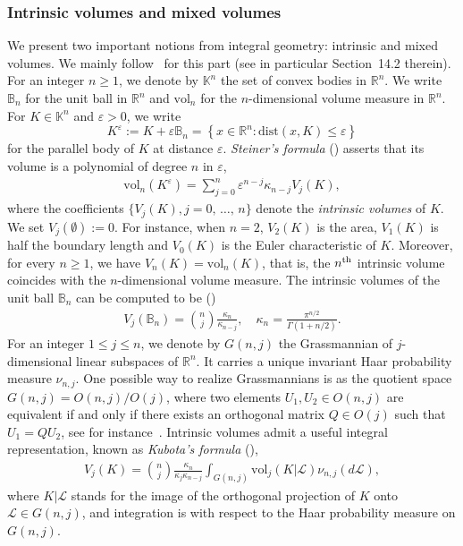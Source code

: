 \documentclass[AHL,Unicode,longabstracts,published]{cedram}
\newcommand{\scL}{\mathscr{L}}
\newcommand{\rvol}{\mathrm{vol}}
\newcommand{\dist}{\mathrm{dist}}
\newcommand{\R}{\mathbb{R}}
\newcommand{\bbB}{\mathbb{B}}
\newcommand{\bbK}{\mathbb{K}}
\newcommand{\eps}{\varepsilon}
\begin{document}
\subsubsection*{Intrinsic volumes and mixed volumes}
We present two important notions from integral geometry: intrinsic and mixed volumes. We mainly follow~\cite{Schneider} for this part (see in particular Section~14.2 therein). For an integer $n\geq1$, we denote by $\bbK^n$ the set of convex bodies in $\R^n$. We write $\bbB_n$ for the unit ball in $\R^n$ and $\rvol_n$ for the $n$-dimensional volume measure in $\R^n$. For $K \in \bbK^n$ and $\eps >0$, we write
\begin{equation*}
K^{\eps}:= K+\eps\bbB_n = \left\{ x\in \R^n: \dist(x,K) \leq \eps\right\}
\end{equation*}
for the parallel body of $K$ at distance $\eps$. \emph{Steiner's formula} (\cite[Eq.~(14.5)]{Schneider}) asserts that its volume is a polynomial of degree $n$ in $\eps$,
\begin{gather}\label{Steiner}
\rvol_n(K^{\eps}) = \sum_{j=0}^n \eps^{n-j} \kappa_{n-j} V_j(K),
\end{gather}
where the coefficients $\{V_j(K), j=0,\,\ldots,\,n\}$ denote the \emph{intrinsic volumes} of $K$. We set $V_j(\emptyset):=0$. For instance, when $n=2$, $V_2(K)$ is the area, $V_1(K)$ is half the boundary length and $V_0(K)$ is the Euler characteristic of $K$. Moreover, for every $n\geq 1$, we have $V_n(K)=\rvol_n(K)$, that is, the $n^{\rm th}$ intrinsic volume coincides with the $n$-dimensional volume measure. The intrinsic volumes of the unit ball $\bbB_n$ can be computed to be (\cite[Eq.~(14.8)]{Schneider})
\begin{gather*}
V_j(\bbB_n) = \binom{n}{j} \frac{\kappa_{n}}{\kappa_{n-j}}, \quad \kappa_{n}= \frac{\pi^{n/2}}{\Gamma(1+n/2)}.
\end{gather*}
For an integer $1\leq j\leq n$, we denote by $G(n,j)$ the Grassmannian of $j$-dimensional linear subspaces of $\R^n$. It carries a unique invariant Haar probability measure $\nu_{n,j}$. One possible way to realize Grassmannians is as the quotient space $G(n,j) = O(n,j)/O(j)$, where two elements $U_1,U_2 \in O(n,j)$ are equivalent if and only if there exists an orthogonal matrix $Q \in O(j)$ such that $U_1= QU_2$, see for instance~\cite[p.~8-9]{Ch2012}. Intrinsic volumes admit a useful integral representation, known as \emph{Kubota's formula} (\cite[Eq.~(6.11)]{Schneider}),
\begin{gather}\label{Kubota}
V_j(K) = \binom{n}{j}\frac{\kappa_n}{\kappa_j \kappa_{n-j}}\int_{G(n,j)} \rvol_j(K|\scL) \nu_{n,j}(d\scL),
\end{gather}
where $K|\scL$ stands for the image of the orthogonal projection of $K$ onto $\scL \in G(n,j)$, and integration is with respect to the Haar probability measure on $G(n,j)$.
\end{document}
